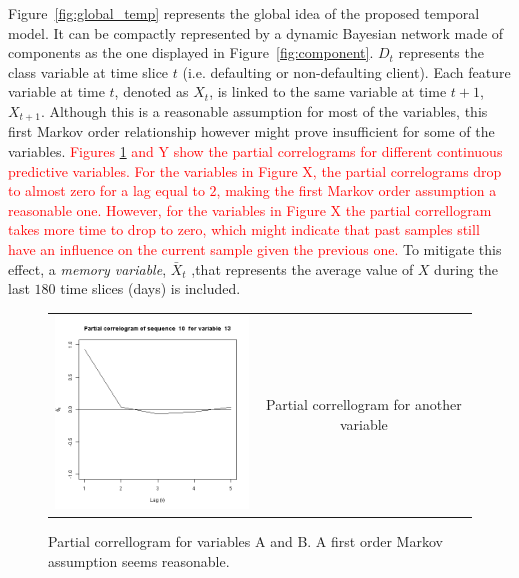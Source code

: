 Figure~\ref{fig:global_temp} represents the global idea of the proposed temporal model. It can be compactly represented by a dynamic Bayesian network made of components as the one displayed in 
Figure~\ref{fig:component}. $D_t$ represents the class variable at time slice $t$ (i.e. defaulting or non-defaulting client). Each feature variable at time $t$, denoted as $X_t$, is linked to the same variable at time $t+1$, $X_{t+1}$. Although this is a reasonable assumption for most of the variables, this first Markov order relationship however might prove insufficient for some of the variables. \textcolor{red}{Figures \ref{fig:cajamarPC1order} and Y show the partial correlograms for different continuous predictive variables. For the variables in Figure X, the partial correlograms drop to almost zero for a lag equal to $2$, making the first Markov order assumption a reasonable one. However, for the variables in Figure X the partial correllogram takes more time to drop to zero, which might indicate that past samples still have an influence on the current sample given the previous one.} To mitigate this effect,  a \emph{memory variable}, $\bar{X}_t$ ,that represents the average value of $X$ during the last $180$ time slices (days) is included. 


\begin{figure}
  \centering
    \begin{tabular}{cc}
    \includegraphics[width=70mm]{figures/CajaMarpcrl13}&
    \begin{minipage}[b]{0.45\linewidth} Partial correllogram for another variable\end{minipage}\\
  \end{tabular}
    \caption{\label{fig:cajamarPC1order}Partial correllogram for variables A and B. A first order Markov assumption seems reasonable.}
\end{figure}


